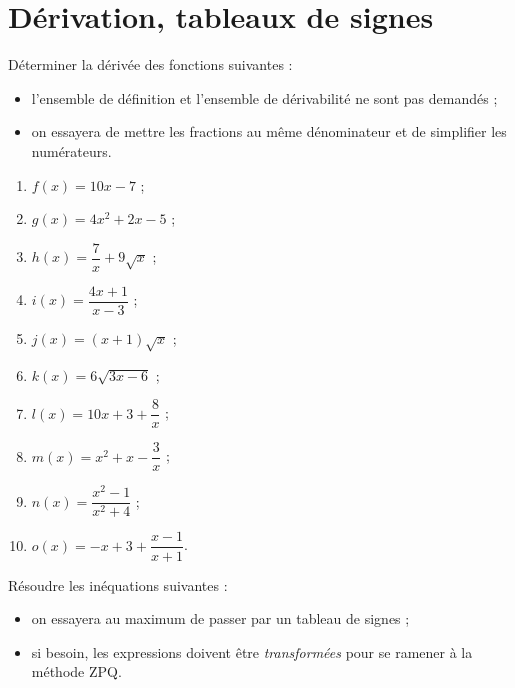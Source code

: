 \documentclass[a4paper,11pt]{article}
\author{Pierquet}
\title{\nomfichier}
\begin{document}
\pagestyle{fancy}

\part{Dérivation, tableaux de signes}

\medskip

\exonum{}

\medskip

Déterminer la dérivée des fonctions suivantes :
%
\begin{itemize}
	\item l'ensemble de définition et l'ensemble de dérivabilité ne sont pas demandés ;
	\item on essayera de mettre les fractions au même dénominateur et de simplifier les numérateurs.
\end{itemize}

\begin{enumerate}
	\item $f(x)=10x-7$ ;					\hfill{}
	\item $g(x)=4x^2+2x-5$ ;				\hfill{}
	\item $h(x)=\dfrac{7}{x}+9\sqrt{x}$ ;	\hfill{}
	\item $i(x)=\dfrac{4x+1}{x-3}$ ;		\hfill{}
	\item $j(x)=(x+1)\sqrt{x}$ ;			\hfill{}
	\item $k(x)=6\sqrt{3x-6}$ ;				\hfill{}
	\item $l(x)=10x+3+\dfrac{8}{x}$ ;		\hfill{}
	\item $m(x)=x^2 + x - \dfrac{3}{x}$ ;	\hfill{}
	\item $n(x)=\dfrac{x^2-1}{x^2+4}$ ;		\hfill{}
	\item $o(x)=-x+3+\dfrac{x-1}{x+1}$.		\hfill{}
\end{enumerate}

\medskip

\exonum{}

\medskip

Résoudre les inéquations suivantes :
%
\begin{itemize}
	\item on essayera au maximum de passer par un tableau de signes ;
	\item si besoin, les expressions doivent être \textit{transformées} pour se ramener à la \textsf{méthode ZPQ}.
\end{itemize}
\end{document}
